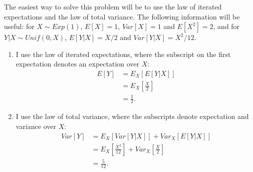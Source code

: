 \begin{problem}{25} The easiest way to solve this problem will be to use the law of iterated expectations and the law of total variance.  The following information will be useful: for $X\sim Exp(1)$, $E[X]=1$, $Var[X]=1$ and $E[X^2]=2$, and for $Y|X \sim Unif(0, X)$, $E[Y|X]=X/2$ and $Var[Y|X] = X^2/12$.
\begin{enumerate}

\item I use the law of iterated expectations, where the subscript on the first expectation denotes an expectation over $X$:
\begin{align*}
E[Y] &= E_X[E[Y|X]] \\
& = E_X\left[\frac{X}{2} \right]\\
& = \frac{1}{2}.
\end{align*}

\item I use the law of total variance, where the subscripts denote expectation and variance over $X$:
\begin{align*}
Var[Y] &= E_X[Var[Y|X]] +Var_X[E[Y|X]]\\
& = E_X\left[\frac{X^2}{12} \right]+Var_X\left[\frac{X}{2} \right]\\\
& = \frac{5}{12}.
\end{align*}

\end{enumerate}
\end{problem}

